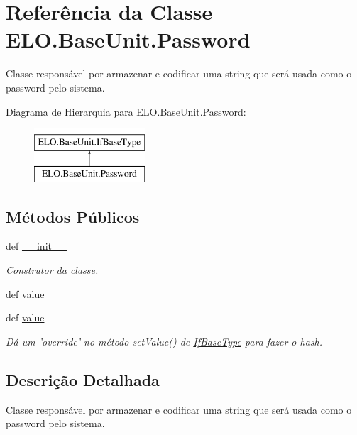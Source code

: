 \hypertarget{classELO_1_1BaseUnit_1_1Password}{\section{Referência da Classe E\-L\-O.\-Base\-Unit.\-Password}
\label{d4/df5/classELO_1_1BaseUnit_1_1Password}
}


Classe responsável por armazenar e codificar uma string que será usada como o password pelo sistema.  


Diagrama de Hierarquia para E\-L\-O.\-Base\-Unit.\-Password\-:\begin{figure}[H]
\begin{center}
\leavevmode
\includegraphics[height=2.000000cm]{d4/df5/classELO_1_1BaseUnit_1_1Password}
\end{center}
\end{figure}
\subsection*{Métodos Públicos}
\begin{DoxyCompactItemize}
\item 
def \hyperlink{classELO_1_1BaseUnit_1_1Password_a01568369a90b21117ba3beb05cbf9dfe}{\-\_\-\-\_\-init\-\_\-\-\_\-}
\begin{DoxyCompactList}\small\item\em Construtor da classe. \end{DoxyCompactList}\item 
def \hyperlink{classELO_1_1BaseUnit_1_1Password_a42dcd63788a2eed3780c39f368356546}{value}
\item 
def \hyperlink{classELO_1_1BaseUnit_1_1Password_a42dcd63788a2eed3780c39f368356546}{value}
\begin{DoxyCompactList}\small\item\em Dá um 'override' no método set\-Value() de \hyperlink{classELO_1_1BaseUnit_1_1IfBaseType}{If\-Base\-Type} para fazer o hash. \end{DoxyCompactList}\end{DoxyCompactItemize}


\subsection{Descrição Detalhada}
Classe responsável por armazenar e codificar uma string que será usada como o password pelo sistema. 



